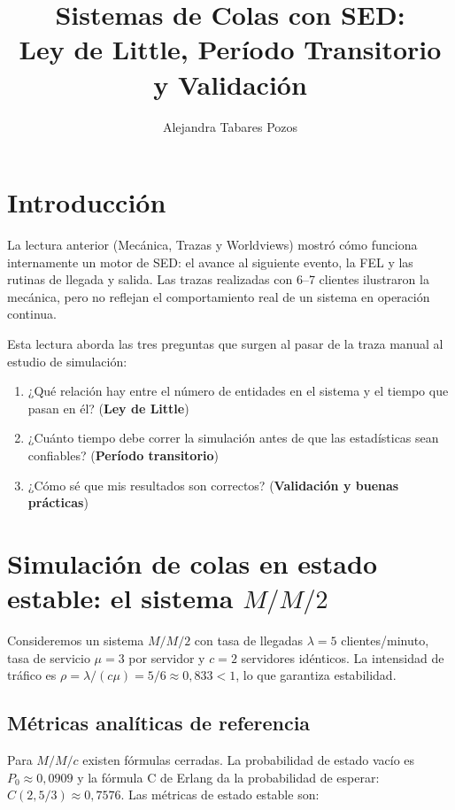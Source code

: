 \documentclass[11pt, letterpaper]{article}
\title{Sistemas de Colas con SED:\\[4pt]
Ley de Little, Período Transitorio y Validación}
\author{Alejandra Tabares Pozos}
\date{}
\begin{document}
\maketitle
\tableofcontents
\newpage

\section{Introducción}

La lectura anterior (Mecánica, Trazas y Worldviews) mostró cómo funciona internamente un motor de SED: el avance al siguiente evento, la FEL y las rutinas de llegada y salida. Las trazas realizadas con 6--7 clientes ilustraron la mecánica, pero no reflejan el comportamiento real de un sistema en operación continua.

Esta lectura aborda las tres preguntas que surgen al pasar de la traza manual al estudio de simulación:
\begin{enumerate}
    \item ¿Qué relación hay entre el número de entidades en el sistema y el tiempo que pasan en él? (\textbf{Ley de Little})
    \item ¿Cuánto tiempo debe correr la simulación antes de que las estadísticas sean confiables? (\textbf{Período transitorio})
    \item ¿Cómo sé que mis resultados son correctos? (\textbf{Validación y buenas prácticas})
\end{enumerate}

\section{Simulación de colas en estado estable: el sistema $M/M/2$}

Consideremos un sistema $M/M/2$ con tasa de llegadas $\lambda = 5$ clientes/minuto, tasa de servicio $\mu = 3$ por servidor y $c = 2$ servidores idénticos. La intensidad de tráfico es $\rho = \lambda/(c\mu) = 5/6 \approx 0{,}833 < 1$, lo que garantiza estabilidad.

\subsection{Métricas analíticas de referencia}

Para $M/M/c$ existen fórmulas cerradas. La probabilidad de estado vacío es $P_0 \approx 0{,}0909$ y la fórmula C de Erlang da la probabilidad de esperar: $C(2, 5/3) \approx 0{,}7576$. Las métricas de estado estable son:
\end{document}
